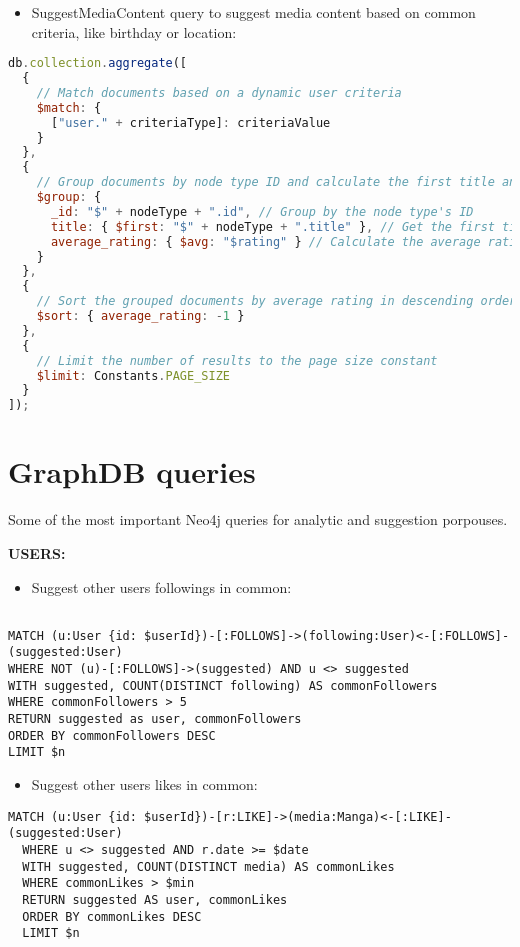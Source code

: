 \begin{itemize}
  \item SuggestMediaContent query to suggest media content based on common criteria, like birthday or location:
  
\end{itemize}

\begin{lstlisting}[language=JavaScript, caption=SuggestMediaContent]
  db.collection.aggregate([
  {
    // Match documents based on a dynamic user criteria
    $match: {
      ["user." + criteriaType]: criteriaValue
    }
  },
  {
    // Group documents by node type ID and calculate the first title and average rating
    $group: {
      _id: "$" + nodeType + ".id", // Group by the node type's ID
      title: { $first: "$" + nodeType + ".title" }, // Get the first title in the group
      average_rating: { $avg: "$rating" } // Calculate the average rating for the group
    }
  },
  {
    // Sort the grouped documents by average rating in descending order
    $sort: { average_rating: -1 }
  },
  {
    // Limit the number of results to the page size constant
    $limit: Constants.PAGE_SIZE
  }
]);
\end{lstlisting}

\section{GraphDB queries}
Some of the most important Neo4j queries for analytic and suggestion porpouses.

\textbf{USERS:}

\begin{itemize}
  \item Suggest other users followings in common:
\end{itemize}
\begin{lstlisting}[language=Cypher, caption=SuggestUsersByCommonFollowings]

MATCH (u:User {id: $userId})-[:FOLLOWS]->(following:User)<-[:FOLLOWS]-(suggested:User) 
WHERE NOT (u)-[:FOLLOWS]->(suggested) AND u <> suggested 
WITH suggested, COUNT(DISTINCT following) AS commonFollowers 
WHERE commonFollowers > 5 
RETURN suggested as user, commonFollowers 
ORDER BY commonFollowers DESC 
LIMIT $n
\end{lstlisting}

\begin{itemize}
  \item Suggest other users likes in common:
\end{itemize}
\begin{lstlisting}[language=Cypher, caption=SuggestUsersByCommonLikes]
  MATCH (u:User {id: $userId})-[r:LIKE]->(media:Manga)<-[:LIKE]-(suggested:User) 
  WHERE u <> suggested AND r.date >= $date
  WITH suggested, COUNT(DISTINCT media) AS commonLikes
  WHERE commonLikes > $min
  RETURN suggested AS user, commonLikes
  ORDER BY commonLikes DESC
  LIMIT $n
\end{lstlisting}



